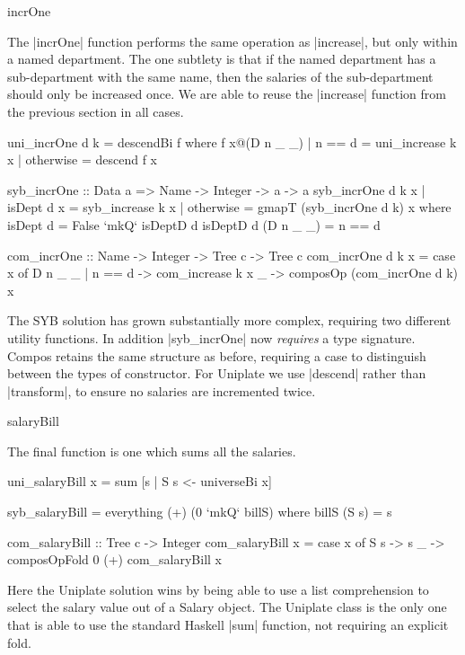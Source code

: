 \begin{examplename}{incrOne}

The |incrOne| function performs the same operation as |increase|, but only within a named department. The one subtlety is that if the named department has a sub-department with the same name, then the salaries of the sub-department should only be increased once. We are able to reuse the |increase| function from the previous section in all cases.

\ignore\begin{code}
uni_incrOne d k = descendBi f
    where f x@(D n _ _)  | n == d     = uni_increase k x
                         | otherwise  = descend f x
\end{code}
\ignore\begin{code}
syb_incrOne :: Data a => Name -> Integer -> a -> a
syb_incrOne d k x  | isDept d x  = syb_increase k x
                   | otherwise   = gmapT (syb_incrOne d k) x
    where  isDept   d = False `mkQ` isDeptD d
           isDeptD  d (D n _ _) = n == d

com_incrOne :: Name -> Integer -> Tree c -> Tree c
com_incrOne d k x = case x of
    D n _ _ | n == d -> com_increase k x
    _ -> composOp (com_incrOne d k) x
\end{code}

The SYB solution has grown substantially more complex, requiring two different utility functions. In addition |syb_incrOne| now \textit{requires} a type signature. Compos retains the same structure as before, requiring a case to distinguish between the types of constructor. For Uniplate we use |descend| rather than |transform|, to ensure no salaries are incremented twice.
\end{examplename}

\begin{examplename}{salaryBill}

The final function is one which sums all the salaries.

\ignore\begin{code}
uni_salaryBill x = sum [s | S s <- universeBi x]

syb_salaryBill = everything (+) (0 `mkQ` billS)
   where billS (S s) = s

com_salaryBill :: Tree c -> Integer
com_salaryBill x = case x of
    S s -> s
    _ -> composOpFold 0 (+) com_salaryBill x
\end{code}

Here the Uniplate solution wins by being able to use a list comprehension to select the salary value out of a Salary object. The Uniplate class is the only one that is able to use the standard Haskell |sum| function, not requiring an explicit fold.
\end{examplename}

